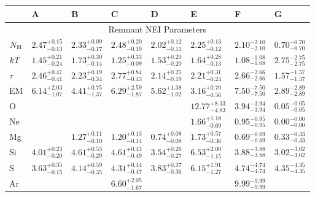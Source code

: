 \begin{tabular}{@{}llllllll@{}}
\toprule
 & A & B & C & D & E & F & G \\
\midrule
\multicolumn{8}{c}{Remnant NEI Parameters} \\
\midrule
$N_{\mathrm{H}}$ & ${2.47}^{+0.15}_{-0.13}$ & ${2.33}^{+0.09}_{-0.17}$ & ${2.48}^{+0.20}_{-0.19}$ & ${2.02}^{+0.12}_{-0.11}$ & ${2.25}^{+0.13}_{-0.12}$ & ${2.10}^{-2.10}_{-2.10}$ & ${0.70}^{-0.70}_{-0.70}$ \\ [0.5 em]
$k T$ & ${1.45}^{+0.21}_{-0.24}$ & ${1.73}^{+0.30}_{-0.14}$ & ${1.25}^{+0.33}_{-0.09}$ & ${1.53}^{+0.20}_{-0.20}$ & ${1.64}^{+0.28}_{-0.13}$ & ${1.08}^{-1.08}_{-1.08}$ & ${2.75}^{-2.75}_{-2.75}$ \\ [0.5 em]
$\tau$ & ${2.46}^{+0.47}_{-0.41}$ & ${2.23}^{+0.19}_{-0.34}$ & ${2.77}^{+0.84}_{-0.43}$ & ${2.14}^{+0.25}_{-0.19}$ & ${2.21}^{+0.31}_{-0.24}$ & ${2.66}^{-2.66}_{-2.66}$ & ${1.57}^{-1.57}_{-1.57}$ \\ [0.5 em]
EM & ${6.14}^{+2.03}_{-1.07}$ & ${4.41}^{+0.75}_{-1.37}$ & ${6.29}^{+2.59}_{-1.87}$ & ${5.62}^{+1.38}_{-1.02}$ & ${3.16}^{+0.70}_{-0.56}$ & ${7.50}^{-7.50}_{-7.50}$ & ${2.89}^{-2.89}_{-2.89}$ \\ [0.5 em]
O &      &      &      &      & ${12.77}^{+8.33}_{-4.83}$ & ${3.94}^{-3.94}_{-3.94}$ & ${0.05}^{-0.05}_{-0.05}$ \\ [0.5 em]
Ne &      &      &      &      & ${1.66}^{+1.18}_{-0.69}$ & ${0.95}^{-0.95}_{-0.95}$ & ${0.00}^{-0.00}_{-0.00}$ \\ [0.5 em]
Mg &      & ${1.27}^{+0.11}_{-0.10}$ & ${1.20}^{+0.13}_{-0.14}$ & ${0.74}^{+0.08}_{-0.08}$ & ${1.73}^{+0.57}_{-0.36}$ & ${0.69}^{-0.69}_{-0.69}$ & ${0.33}^{-0.33}_{-0.33}$ \\ [0.5 em]
Si & ${4.01}^{+0.23}_{-0.20}$ & ${4.61}^{+0.53}_{-0.29}$ & ${4.61}^{+0.43}_{-0.49}$ & ${3.54}^{+0.26}_{-0.27}$ & ${6.53}^{+2.00}_{-1.15}$ & ${3.88}^{-3.88}_{-3.88}$ & ${3.02}^{-3.02}_{-3.02}$ \\ [0.5 em]
S & ${3.63}^{+0.35}_{-0.15}$ & ${4.14}^{+0.59}_{-0.35}$ & ${4.31}^{+0.44}_{-0.47}$ & ${3.83}^{+0.37}_{-0.36}$ & ${6.15}^{+1.91}_{-1.27}$ & ${4.74}^{-4.74}_{-4.74}$ & ${4.35}^{-4.35}_{-4.35}$ \\ [0.5 em]
Ar &      &      & ${6.60}^{+2.05}_{-1.67}$ &      &      & ${9.99}^{-9.99}_{-9.99}$ &      \\ [0.5 em]

\end{tabular}
